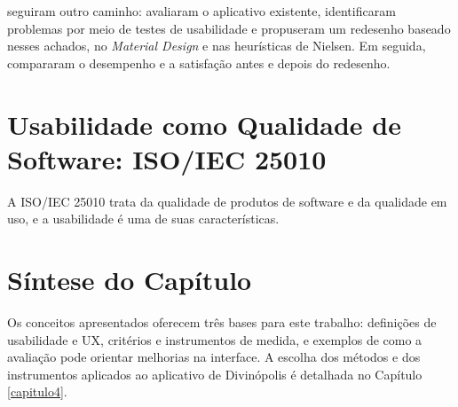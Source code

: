  seguiram outro caminho: avaliaram o aplicativo existente, identificaram problemas por meio de testes de usabilidade e propuseram um redesenho baseado nesses achados, no \textit{Material Design} e nas heurísticas de Nielsen. Em seguida, compararam o desempenho e a satisfação antes e depois do redesenho. 

\section{Usabilidade como Qualidade de Software: ISO/IEC 25010}

A ISO/IEC 25010 trata da qualidade de produtos de software e da qualidade em uso, e a usabilidade é uma de suas características. 

\section{Síntese do Capítulo}

Os conceitos apresentados oferecem três bases para este trabalho: definições de usabilidade e UX, critérios e instrumentos de medida, e exemplos de como a avaliação pode orientar melhorias na interface. A escolha dos métodos e dos instrumentos aplicados ao aplicativo de Divinópolis é detalhada no Capítulo \ref{capitulo4}.
